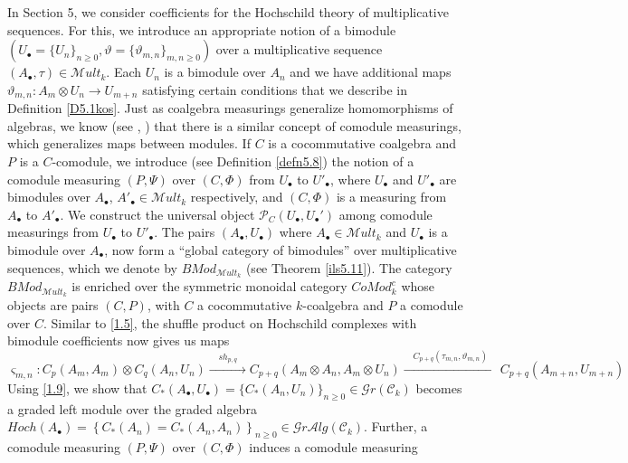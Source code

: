 \documentclass[10pt, colorlinks]{article}
\numberwithin{equation}{section} \DeclareMathSizes{2}{10}{12}{13}
\begin{document}
            
            \smallskip
            In Section 5, we consider coefficients for the Hochschild theory of multiplicative sequences. For this, we  introduce an appropriate notion of a bimodule $(U_\bullet=\{U_n\}_{n\geq 0},\vartheta=\{\vartheta_{m,n}\}_{m,n\geq 0})$ over a multiplicative sequence $(A_\bullet,\tau)\in \mathscr{M}ult_k$. Each $U_n$ is a bimodule over $A_n$ and we have additional maps $\vartheta_{m,n}:A_m\otimes U_n\longrightarrow U_{m+n}$ satisfying certain conditions that we describe in Definition \ref{D5.1kos}. Just as coalgebra measurings generalize homomorphisms of algebras, we know (see \cite{MB}, \cite{MH}) that there is a similar concept of comodule measurings, which generalizes maps between modules.  If $C$ is a cocommutative coalgebra and $P$ is a $C$-comodule, we introduce (see Definition \ref{defn5.8}) the notion of a comodule measuring $(P,\Psi)$ over $(C,\Phi)$ from $U_\bullet$ to $U'_\bullet$, where $U_\bullet$ and $U'_\bullet$ are bimodules over 
            $A_\bullet$, $A'_\bullet\in \mathscr{M}ult_k$ respectively, and $(C,\Phi)$ is a measuring from $A_\bullet$ to $A'_\bullet$. We construct the universal object $\mathcal P_C(U_\bullet,U_\bullet')$ among comodule measurings from $U_\bullet$ to $U'_\bullet$. The pairs $(A_\bullet,U_\bullet)$ where $A_\bullet\in \mathscr{M}ult_k$ and $U_\bullet$ is a bimodule over 
            $A_\bullet$, now form a ``global category of bimodules'' over multiplicative sequences, which we denote by $BMod_{\mathscr Mult_k}$ (see Theorem \ref{ils5.11}). The category $BMod_{\mathscr Mult_k}$ is enriched over the symmetric monoidal category $CoMod^c_k$ whose objects are pairs $(C,P)$, with $C$ a cocommutative $k$-coalgebra and $P$ a comodule over $C$. Similar to \eqref{1.5}, the shuffle product on Hochschild complexes with bimodule coefficients now gives us maps
            \begin{equation}\label{1.9}
            \varsigma_{m,n}:C_p(A_m,A_m)\otimes  C_q(A_n,U_n)\xrightarrow {\quad sh_{p,q}\quad}C_{p+q}(A_m\otimes A_n,A_m\otimes U_n)\xrightarrow{\quad C_{p+q}(\tau_{m,n},\vartheta_{m,n})\quad}  C_{p+q}(A_{m+n},U_{m+n})
            \end{equation} Using \eqref{1.9}, we show that $C_*(A_\bullet,U_\bullet)=\{C_*(A_n,U_n)\}_{n\geq 0}\in  \mathscr Gr(\mathcal C_k)$ becomes a graded left module over the graded algebra $Hoch(A_\bullet)=\left\{C_*(A_n)=C_*(A_n,A_n)\right\}_{n\geq 0}\in   \mathscr Gr\mathcal Alg(\mathcal C_k)$. Further, a comodule measuring $(P,\Psi)$ over $(C,\Phi)$ induces a comodule measuring 
\end{document}
